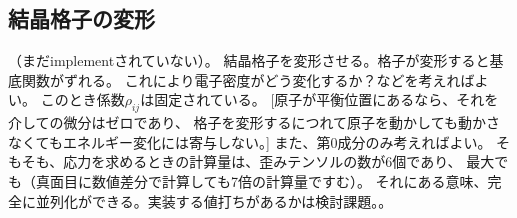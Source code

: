 \documentclass[a4paper,10pt,aip,onecolumn,amsmath,amssymb,floatfix,rmp]{revtex4-1}
\newcommand{\bfr}{{\bf r}}
\newcommand{\bfR}{{\bf R}}
\newcommand{\req}[1]{\mbox{Eq.~\!(\ref{#1})}}
\def\tnT{\tilde{n}^{\rm T}}
\def\tnT{\tilde{n}^{\rm T}}
\begin{document}




\subsection{結晶格子の変形}
（まだimplementされていない）。
結晶格子を変形させる。格子が変形すると基底関数がずれる。
これにより電子密度がどう変化するか？などを考えればよい。
このとき係数$\rho_{ij}$は固定されている。
[原子が平衡位置にあるなら、それを介しての微分はゼロであり、
格子を変形するにつれて原子を動かしても動かさなくてもエネルギー変化には寄与しない。]
また、第0成分のみ考えればよい。
そもそも、応力を求めるときの計算量は、歪みテンソルの数が6個であり、
最大でも（真面目に数値差分で計算しても7倍の計算量ですむ）。
それにある意味、完全に並列化ができる。実装する値打ちがあるかは検討課題。。
\end{document}
